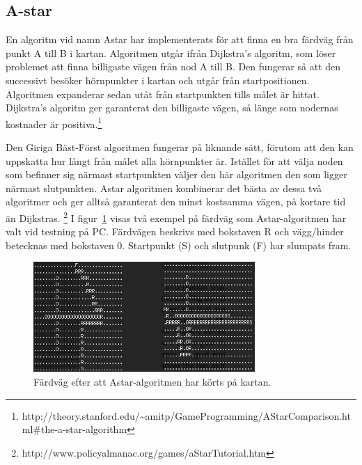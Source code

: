 \documentclass[a4paper,12pt,fleqn]{article}
\begin{document}
\newpage
\subsection{A-star}
En algoritm vid namn Astar har implementerats för att finna en bra färdväg från punkt A till B i kartan. Algoritmen utgår ifrån Dijkstra's algoritm, som löser problemet att finna billigaste vägen från nod A till B. Den fungerar så att den successivt besöker hörnpunkter i kartan och utgår från startpositionen. Algoritmen expanderar sedan utåt från startpunkten tills målet är hittat. Dijkstra’s algoritm ger garanterat den billigaste vägen, så länge som nodernas kostnader är positiva.\footnote{http://theory.stanford.edu/\textasciitilde amitp/GameProgramming/AStarComparison.html\#the-a-star-algorithm}

Den Giriga Bäst-Först algoritmen fungerar på liknande sätt, förutom att den kan uppskatta hur långt från målet alla hörnpunkter är. Istället för att välja noden som befinner sig närmast startpunkten väljer den här algoritmen den som ligger närmast slutpunkten. Astar algoritmen kombinerar det bästa av dessa två algoritmer och ger alltså garanterat den minst kostsamma vägen, på kortare tid än Dijkstras. \footnote{http://www.policyalmanac.org/games/aStarTutorial.htm}
\newline
I figur~\ref{fig:Astar} visas två exempel på färdväg som Astar-algoritmen har valt vid testning på PC. Färdvägen beskrivs med bokstaven R och vägg/hinder betecknas med bokstaven 0. Startpunkt (S) och slutpunk (F) har slumpats fram. 

\begin{figure}[htp] %
  \begin{center}
  \includegraphics[width=0.75\textwidth]{Astar.png}  %
  \caption{Färdväg efter att Astar-algoritmen har körts på kartan.}%
  \end{center}
  \label{fig:Astar}
\end{figure}
\end{document}
